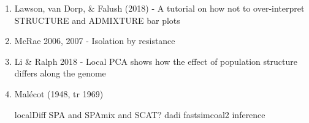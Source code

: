 \documentclass[12pt]{article}
\begin{document}
\begin{enumerate}
\item Lawson, van Dorp, \& Falush (2018) - A tutorial on how not to over-interpret STRUCTURE and ADMIXTURE bar plots
\subitem 

\item McRae 2006, 2007 - Isolation by resistance
\subitem 

\item Li \& Ralph 2018 - Local PCA shows how the effect of population structure differs along the genome
\subitem 

\item Mal\'{e}cot (1948, tr 1969)
\subitem

localDiff
SPA and SPAmix and SCAT?
dadi
fastsimcoal2 inference

\end{enumerate}
\end{document}
